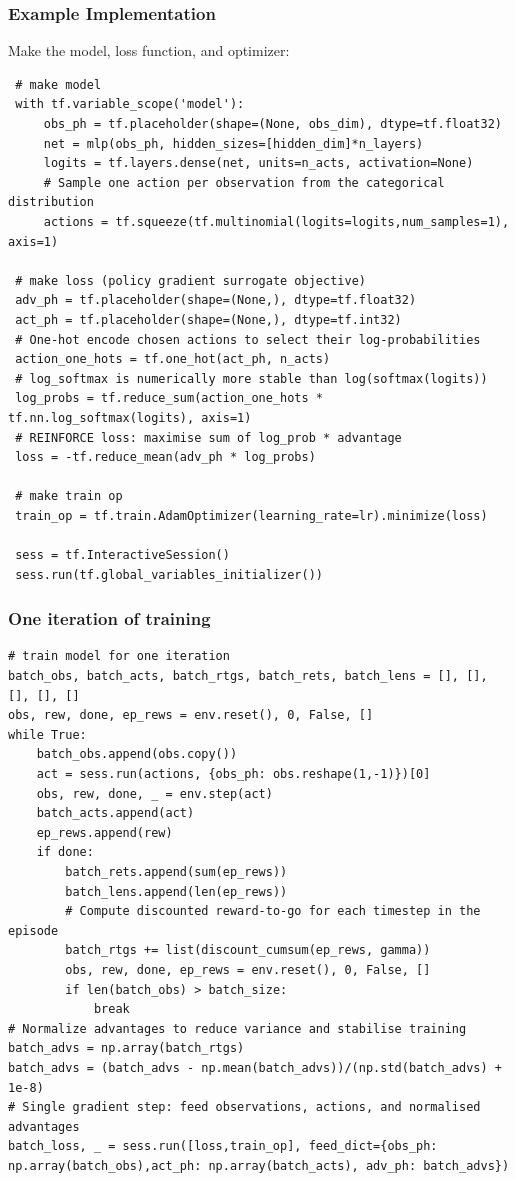 \begin{frame}[fragile]\frametitle{Example Implementation}

Make the model, loss function, and optimizer:
\begin{lstlisting}
 # make model
 with tf.variable_scope('model'):
     obs_ph = tf.placeholder(shape=(None, obs_dim), dtype=tf.float32)
     net = mlp(obs_ph, hidden_sizes=[hidden_dim]*n_layers)
     logits = tf.layers.dense(net, units=n_acts, activation=None)
     # Sample one action per observation from the categorical distribution
     actions = tf.squeeze(tf.multinomial(logits=logits,num_samples=1), axis=1)

 # make loss (policy gradient surrogate objective)
 adv_ph = tf.placeholder(shape=(None,), dtype=tf.float32)
 act_ph = tf.placeholder(shape=(None,), dtype=tf.int32)
 # One-hot encode chosen actions to select their log-probabilities
 action_one_hots = tf.one_hot(act_ph, n_acts)
 # log_softmax is numerically more stable than log(softmax(logits))
 log_probs = tf.reduce_sum(action_one_hots * tf.nn.log_softmax(logits), axis=1)
 # REINFORCE loss: maximise sum of log_prob * advantage
 loss = -tf.reduce_mean(adv_ph * log_probs)

 # make train op
 train_op = tf.train.AdamOptimizer(learning_rate=lr).minimize(loss)

 sess = tf.InteractiveSession()
 sess.run(tf.global_variables_initializer())
\end{lstlisting}


\end{frame}

\begin{frame}[fragile]\frametitle{One iteration of training}
\begin{lstlisting}
# train model for one iteration
batch_obs, batch_acts, batch_rtgs, batch_rets, batch_lens = [], [], [], [], []
obs, rew, done, ep_rews = env.reset(), 0, False, []
while True:
    batch_obs.append(obs.copy())
    act = sess.run(actions, {obs_ph: obs.reshape(1,-1)})[0]
    obs, rew, done, _ = env.step(act)
    batch_acts.append(act)
    ep_rews.append(rew)
    if done:
        batch_rets.append(sum(ep_rews))
        batch_lens.append(len(ep_rews))
        # Compute discounted reward-to-go for each timestep in the episode
        batch_rtgs += list(discount_cumsum(ep_rews, gamma))
        obs, rew, done, ep_rews = env.reset(), 0, False, []
        if len(batch_obs) > batch_size:
            break
# Normalize advantages to reduce variance and stabilise training
batch_advs = np.array(batch_rtgs)
batch_advs = (batch_advs - np.mean(batch_advs))/(np.std(batch_advs) + 1e-8)
# Single gradient step: feed observations, actions, and normalised advantages
batch_loss, _ = sess.run([loss,train_op], feed_dict={obs_ph: np.array(batch_obs),act_ph: np.array(batch_acts), adv_ph: batch_advs})
\end{lstlisting}


\end{frame}


